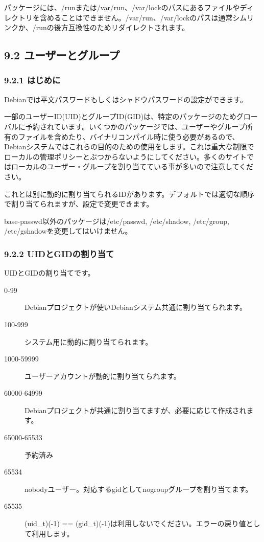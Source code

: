 \documentclass[mingoth,a4paper]{jsarticle}
\begin{document}
パッケージには、/runまたは/var/run、/var/lockのパスにあるファイルやディ
レクトリを含めることはできません。/var/run、/var/lockのパスは通常シムリ
ンクか、/runの後方互換性のためリダイレクトされます。

\subsection{9.2 ユーザーとグループ}

\subsubsection{9.2.1 はじめに}

Debianでは平文パスワードもしくはシャドウパスワードの設定ができます。

一部のユーザーID(UID)とグループID(GID)は、特定のパッケージのためグロー
バルに予約されています。いくつかのパッケージでは、ユーザーやグループ所
有のファイルを含めたり、バイナリコンパイル時に使う必要があるので、
Debianシステムではこれらの目的のための使用をします。これは重大な制限で
ローカルの管理ポリシーとぶつからないようにしてください。多くのサイトで
はローカルのユーザー・グループを割り当てている事が多いので注意してくだ
さい。

これとは別に動的に割り当てられるIDがあります。デフォルトでは適切な順序
で割り当てられますが、設定で変更できます。

base-passwd以外のパッケージは/etc/passwd, /etc/shadow, /etc/group,
/etc/gshadowを変更してはいけません。

\subsubsection{9.2.2 UIDとGIDの割り当て}

UIDとGIDの割り当てです。

\begin{description}
\item[0-99]
Debianプロジェクトが使いDebianシステム共通に割り当てられます。
\item[100-999]
システム用に動的に割り当てられます。
\item[1000-59999]
ユーザーアカウントが動的に割り当てられます。
\item[60000-64999]
Debianプロジェクトが共通に割り当てますが、必要に応じて作成されます。
\item[65000-65533]
予約済み
\item[65534]
nobodyユーザー。対応するgidとしてnogroupグループを割り当てます。
\item[65535]
(uid\_t)(-1) ==
(gid\_t)(-1)は利用しないでください。エラーの戻り値として利用します。
\end{description}
\end{document}
